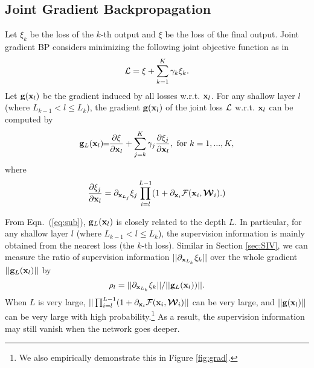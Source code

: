 \documentclass[10pt,onecolumn,letterpaper]{article}
\def\mF{{\mathcal F}}
\def\bmW{\mbox{\boldmath${\mathcal W}$}}
\def\bg{{\bf g}}
\def\bx{{\bf x}}
\begin{document}
\subsection{Joint Gradient Backpropagation}
Let ${\xi}_k$ be the loss of the $k$-th output and ${\xi}$ be the loss of the final output. Joint gradient BP considers minimizing the following joint objective function as in~\cite{Lee2015}
\begin{equation} \label{eq:companion_obj}
{\cal{L}} = {\xi} + \sum\limits_{k = 1}^K {{\gamma _k}{\xi}_k}.
\end{equation}
Let $\bg(\bx_l)$ be the gradient induced by all losses w.r.t. $\bx_l$.
For any shallow layer $l$ (where $L_{k-1} < l \leq L_k$), the gradient $\bg(\bx_l)$ of the joint loss ${\cal{L}}$ w.r.t. $\bx_l$  can be computed by
\begin{equation}\label{eq:joint_gradient}
\bg_L(\bx_l) \!\!=\!\!  \frac{{\partial \xi }}{{\partial {\bx_l}}}  +  \sum_{j=k}^K\gamma_j\frac{{\partial \xi_j }}{{\partial {\bx_l}}}, \mathrm{~for~}
k = 1, ..., K,
\end{equation}
where
\begin{equation}\label{eq:sub}
\frac{{\partial \xi_j }}{\partial {\bx_l}} = {\partial_{\bx_{L_j}} \xi_j}  \prod_{i = l}^{L - 1} ( {1 + \partial_{\bx_i}  {\mF({\bx_i},{{\bmW}_i})}} . )\end{equation}

From Eqn.~(\ref{eq:sub}), $\bg_L(\bx_l)$ is closely related to the depth $L$. In particular, for any shallow layer $l$ (where $L_{k-1} < l \leq L_k$), the supervision information is mainly obtained from the nearest loss (\ie the $k$-th loss).
Similar in Section \ref{sec:SIV}, we can measure the ratio of supervision information  $||{\partial_{\bx_{L_k}} \xi_k}||$ over the whole gradient $||\bg_L(\bx_l)||$ by
\begin{equation}\label{eq:joint_ratio}
\rho_l = {||{\partial_{\bx_{L_k}} \xi_k}||}/{||\bg_L(\bx_l))||}.
\end{equation}
When $L$ is very large, $||\prod_{i = l}^{L - 1} ( {1 + \partial_{\bx_i}  {\mF({\bx_i},{{\bmW}_i})}}||$ can be very large, and $||\bg(\bx_l)||$ can be very large with high probability.\footnote{We also empirically demonstrate this in Figure \ref{fig:grad}.}
As a result, the supervision information may still vanish when the network goes deeper. 
\end{document}
